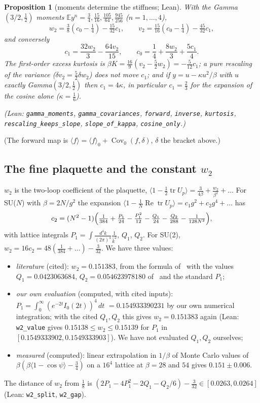 \documentclass[11pt,a4paper]{article}
\newtheorem{proposition}[theorem]{Proposition}
\theoremstyle{definition}
\theoremstyle{remark}
\newcommand{\E}{\mathbb{E}}
\newcommand{\code}[1]{\texttt{#1}}
\begin{document}
\begin{proposition}[moments determine the stiffness; Lean]\label{prop:moments}
With the Gamma$(3/2,\frac12)$ moments $\E y^n=\frac34,\frac{15}{16},\frac{105}{64},\frac{945}{256}$ ($n=1,\dots,4$),
\[
w_2=\tfrac38(c_0-\tfrac14)-\tfrac{15}{32}c_1,\qquad v_2=\tfrac{15}{16}(c_0-\tfrac14)-\tfrac{45}{32}c_1,
\]
and conversely
\[
c_1=\frac{32w_2}{3}-\frac{64v_2}{15},\qquad c_0=\frac14+\frac{8w_2}{3}+\frac{5c_1}{4}.
\]
The first-order excess kurtosis is $\beta K=\frac{16}9(v_2-\frac52w_2)=-\frac5{12}c_1$; a pure rescaling of the variance ($\delta v_2=\frac52\delta w_2$) does not move $c_1$; and if $y=u-\kappa u^2/\beta$ with $u$ exactly Gamma$(3/2,\frac12)$ then $c_1=4\kappa$, in particular $c_1=\frac23$ for the expansion of the cosine alone ($\kappa=\frac16$).
{\sloppy (Lean: \code{gamma\_moments}, \code{gamma\_covariances}, \code{forward}, \code{inverse}, \code{kurtosis}, \code{rescaling\_keeps\_slope}, \code{slope\_of\_kappa}, \code{cosine\_only}.)\par}
\end{proposition}

(The forward map is $\langle f\rangle=\langle f\rangle_0+\operatorname{Cov}_0(f,\delta)$, $\delta$ the bracket above.)

\subsection{The fine plaquette and the constant \texorpdfstring{$w_2$}{w2}}

$w_2$ is the two-loop coefficient of the plaquette, $\langle1-\frac12\operatorname{tr}U_p\rangle=\frac3{4\beta}+\frac{w_2}{\beta^2}+\dots$ For SU($N$) with $\beta=2N/g^2$ the expansion $\langle1-\frac1N\operatorname{Re}\operatorname{tr}U_p\rangle=c_1g^2+c_2g^4+\dots$ has~\cite{AFP}
\[
c_2=(N^2-1)\Bigl(\tfrac1{384}+\tfrac{P_1}{24}-\tfrac{P_1^2}{12}-\tfrac{Q_1}{24}-\tfrac{Q_2}{288}-\tfrac1{128N^2}\Bigr),
\]
with lattice integrals $P_1=\int\frac{d^4k}{(2\pi)^4}\frac1{\hat k^2}$, $Q_1$, $Q_2$. For SU(2), $w_2=16c_2=48(\tfrac1{384}+\dots)-\tfrac3{32}$. We have three values:
\begin{itemize}[leftmargin=1.5em,itemsep=1pt,topsep=2pt]
\item \emph{literature} (cited): $w_2=0.151383$, from the formula of~\cite{AFP} with the values $Q_1=0.0423063684$, $Q_2=0.054623978180$ of~\cite{LW} and the standard $P_1$;
\item \emph{our own evaluation} (computed, with cited inputs): $P_1=\int_0^\infty(e^{-2t}I_0(2t))^4\,dt$ $=0.154933390231$ by our own numerical integration; with the cited $Q_1,Q_2$ this gives $w_2=0.151383$ again (Lean: \code{w2\_value} gives $0.15138\le w_2\le0.15139$ for $P_1$ in $[0.1549333902,0.1549333903]$). We have not evaluated $Q_1,Q_2$ ourselves;
\item \emph{measured} (computed): linear extrapolation in $1/\beta$ of Monte Carlo values of $\beta(\beta\langle1-\cos\psi\rangle-\frac34)$ on a $16^4$ lattice at $\beta=28$ and $54$ gives $0.151\pm0.006$.
\end{itemize}
The distance of $w_2$ from $\frac18$ is $(2P_1-4P_1^2-2Q_1-Q_2/6)-\frac3{32}\in[0.0263,0.0264]$ (Lean: \code{w2\_split}, \code{w2\_gap}).
\end{document}
